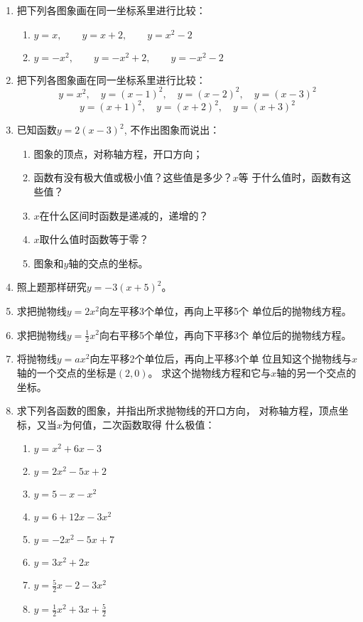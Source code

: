 \begin{enumerate}
    \item 把下列各图象画在同一坐标系里进行比较：
\begin{enumerate}
    \item $y=x,\qquad  y=x+2,\qquad  y=x^2-2$
    \item $y=-x^2,\qquad y=-x^2+2,\qquad y=-x^2-2$
\end{enumerate}

    \item 把下列各图象画在同一坐标系里进行比较：
  \[  y=x^2,\quad     y=(x-1)^2,\quad    y=(x-2)^2,\quad     y=(x-3)^2\]
 \[   y=(x+1)^2,\quad     y=(x+2)^2,\quad     y=(x+3)^2\]
    \item 已知函数$y=2(x-3)^2$, 不作出图象而说出：
\begin{enumerate}
\item 图象的顶点，对称轴方程，开口方向；
\item 函数有没有极大值或极小值？这些值是多少？$x$等
    于什么值时，函数有这些值？
    \item $x$在什么区间时函数是递减的，递增的？
    \item $x$取什么值时函数等于零？
    \item 图象和$y$轴的交点的坐标。
\end{enumerate}

    \item 照上题那样研究$y=-3(x+5)^2$。
    \item 求把抛物线$y=2x^2$向左平移3个单位，再向上平移5个
    单位后的抛物线方程。
    \item 求把抛物线$y=\frac{1}{2}x^2$向右平移5个单位，再向下平移3个
    单位后的抛物线方程。
    \item 将抛物线$y=ax^2$向左平移2个单位后，再向上平移3个单
    位且知这个抛物线与$x$轴的一个交点的坐标是$(2,0)$。
    求这个抛物线方程和它与$x$轴的另一个交点的坐标。
    \item 求下列各函数的图象，并指出所求抛物线的开口方向，
    对称轴方程，顶点坐标，又当$x$为何值，二次函数取得
    什么极值：
\begin{multicols}{2}
    \begin{enumerate}
        \item $y=x^2+6x-3$
        \item $y=2x^2-5x+2$
        \item $y=5-x-x^2$
        \item $y=6+12x-3x^2$
        \item $y=-2x^2-5x+7$
        \item $y=3x^2+2x$
        \item $y=\frac{5}{2}x-2-3x^2$
        \item $y=\frac{1}{2}x^2+3x+\frac{5}{2}$
    \end{enumerate}
\end{multicols}


\end{enumerate}
